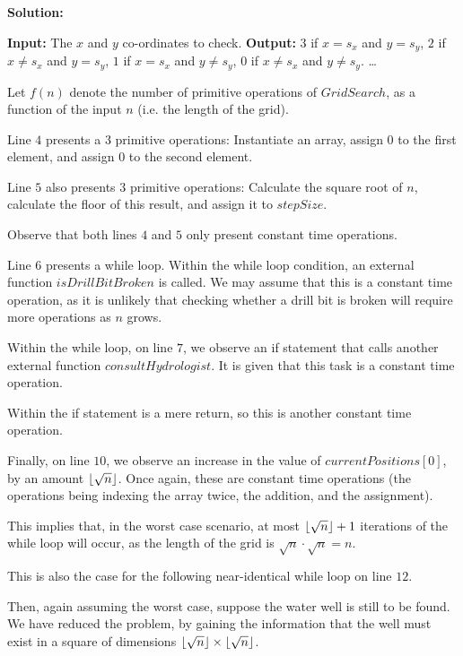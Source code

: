 \documentclass[a4,13pt]{extarticle}
\DeclarePairedDelimiter\floor{\lfloor}{\rfloor}
\newenvironment{Solution}{\color{blue}\textbf{Solution:}}{}
\begin{document}
\begin{enumerate}
\begin{enumerate}
\begin{Solution}
\begin{algorithm}[H]
      	\begin{algorithmic}[1]
\State\textbf{Input: }The $x$ and $y$ co-ordinates to check.
			\State\textbf{Output: }$3$ if $x=s_x$ and $y=s_y$, $2$ if $x\neq s_x$ and $y=s_y$, $1$ if $x=s_x$ and $y\neq s_y$, $0$ if $x\neq s_x$ and $y\neq s_y$.
\State \dots
	      		\EndProcedure
	      	\end{algorithmic}
	      \end{algorithm}

Let $f(n)$ denote the number of primitive operations of $GridSearch$, as a function of the input $n$ (i.e. the length of the grid).

Line $4$ presents a $3$ primitive operations: Instantiate an array, assign $0$ to the first element, and assign $0$ to the second element.

Line $5$ also presents $3$ primitive operations: Calculate the square root of $n$, calculate the floor of this result, and assign it to $stepSize$.

Observe that both lines $4$ and $5$ only present constant time operations.

Line $6$ presents a while loop. Within the while loop condition, an external function $isDrillBitBroken$ is called. We may assume that this is a constant time operation, as it is unlikely that checking whether a drill bit is broken will require more operations as $n$ grows.

Within the while loop, on line $7$, we observe an if statement that calls another external function $consultHydrologist$. It is given that this task is a constant time operation.

Within the if statement is a mere return, so this is another constant time operation.

Finally, on line $10$, we observe an increase in the value of $currentPositions[0]$, by an amount $\floor{\sqrt{n}}$. Once again, these are constant time operations (the operations being indexing the array twice, the addition, and the assignment).

This implies that, in the worst case scenario, at most $\floor{\sqrt{n}}+1$ iterations of the while loop will occur, as the length of the grid is $\sqrt{n}\cdot\sqrt{n}=n$.

This is also the case for the following near-identical while loop on line $12$.

Then, again assuming the worst case, suppose the water well is still to be found. We have reduced the problem, by gaining the information that the well must exist in a square of dimensions $\floor{\sqrt{n}}\times\floor{\sqrt{n}}$.


\end{Solution}
\end{enumerate}
\end{enumerate}
\end{document}
